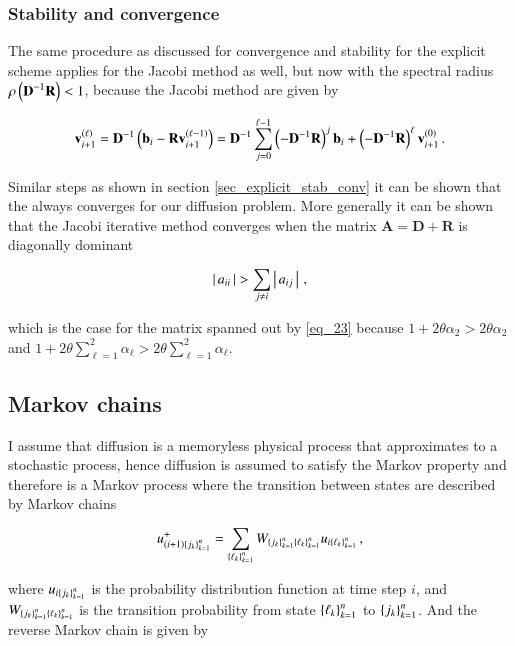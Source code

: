 \documentclass[11pt,english,a4paper]{article}
\begin{document}
\begin{flushleft}
\subsubsection{Stability and convergence}

The same procedure as discussed for convergence and stability for the explicit scheme applies for the Jacobi method as well, but now with the spectral radius $\rho\left({\textbf{D}^{-1} \textbf{R}}\right) < 1$, because the Jacobi method are given by 

\begin{align*}
\textbf{v}_{i+1}^{\left({\ell}\right)} = \textbf{D}^{-1}\left({\textbf{b}_i - \textbf{R}\textbf{v}_{i+1}^{\left({\ell-1}\right)}}\right) = \textbf{D}^{-1}\sum_{j=0}^{\ell-1} \left({-\textbf{D}^{-1}\textbf{R}}\right)^j \textbf{b}_i + \left({-\textbf{D}^{-1}\textbf{R}}\right)^\ell\textbf{v}_{i+1}^{(0)} \,.
\end{align*}

Similar steps as shown in section \ref{sec_explicit_stab_conv} it can be shown that the always converges for our diffusion problem. More generally it can be shown that the Jacobi iterative method converges when the matrix $\textbf{A} = \textbf{D}+ \textbf{R}$ is diagonally dominant 

\begin{align*}
\left\vert{\,a_{ii}\,}\right\vert > \sum_{j\neq i} \left\vert{\,a_{ij}\,}\right\vert\,,
\end{align*}

which is the case for the matrix spanned out by \eqref{eq_23} because $1+2\theta \alpha_2 > 2\theta \alpha_2$ and $1+2\theta\sum_{\ell=1}^2 \alpha_{\ell} > 2\theta\sum_{\ell=1}^2 \alpha_\ell$.

\subsection{Markov chains}

I assume that diffusion is a memoryless physical process that approximates to a stochastic process, hence diffusion is assumed to satisfy the Markov property and therefore is a Markov process where the transition between states are described by Markov chains 

\begin{align}
u_{(i+1)\left\lbrace{j_k}\right\rbrace_{k=1}^n}^+ = \sum_{\left\lbrace{\ell_k}\right\rbrace_{k=1}^n} W_{\left\lbrace{j_k}\right\rbrace_{k=1}^n\left\lbrace{\ell_k}\right\rbrace_{k=1}^n} u_{i\left\lbrace{\ell_k}\right\rbrace_{k=1}^n} \,,
\label{eq_38}
\end{align}

where $u_{i\left\lbrace{j_k}\right\rbrace_{k=1}^n}$ is the probability distribution function  at time step $i$, and $W_{\left\lbrace{j_k}\right\rbrace_{k=1}^n\left\lbrace{\ell_k}\right\rbrace_{k=1}^n}$  is the transition probability from state $\left\lbrace{\ell_k}\right\rbrace_{k=1}^n$ to $\left\lbrace{j_k}\right\rbrace_{k=1}^n$. And the reverse Markov chain is given by


\end{flushleft}
\end{document}
